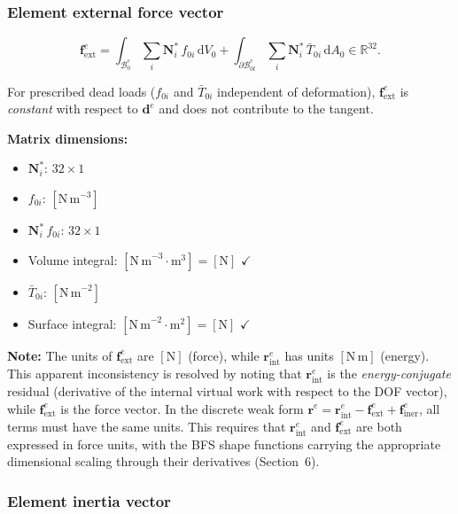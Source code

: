 \documentclass[11pt]{article}
\begin{document}
\subsubsection{Element external force vector}

\begin{equation}
\boxed{
\mathbf{f}_{\mathrm{ext}}^{e}
= \int_{\mathcal{B}_{0}^{e}}
  \sum_{i}\mathbf{N}_{i}^{*}\,f_{0i}\,
  \mathrm{d}V_{0}
+ \int_{\partial\mathcal{B}_{0t}^{e}}
  \sum_{i}\mathbf{N}_{i}^{*}\,\bar{T}_{0i}\,
  \mathrm{d}A_{0}
\in \mathbb{R}^{32}.
}
\label{s7:f_ext}
\end{equation}

For prescribed dead loads ($f_{0i}$ and $\bar{T}_{0i}$ independent of
deformation), $\mathbf{f}_{\mathrm{ext}}^{e}$ is \emph{constant} with
respect to $\mathbf{d}^{e}$ and does not contribute to the tangent.

\textbf{Matrix dimensions:}
\begin{itemize}
\item $\mathbf{N}_{i}^{*}$: $32\times 1$
\item $f_{0i}$: $[\mathrm{N\,m}^{-3}]$
\item $\mathbf{N}_{i}^{*}\,f_{0i}$: $32\times 1$
\item Volume integral: $[\mathrm{N\,m}^{-3}\cdot\mathrm{m}^{3}] = [\mathrm{N}]$ $\checkmark$
\item $\bar{T}_{0i}$: $[\mathrm{N\,m}^{-2}]$
\item Surface integral: $[\mathrm{N\,m}^{-2}\cdot\mathrm{m}^{2}] = [\mathrm{N}]$ $\checkmark$
\end{itemize}

\textbf{Note:} The units of $\mathbf{f}_{\mathrm{ext}}^{e}$ are $[\mathrm{N}]$ (force),
while $\mathbf{r}_{\mathrm{int}}^{e}$ has units $[\mathrm{N\,m}]$ (energy).
This apparent inconsistency is resolved by noting that $\mathbf{r}_{\mathrm{int}}^{e}$
is the \emph{energy-conjugate} residual (derivative of the internal
virtual work with respect to the DOF vector), while
$\mathbf{f}_{\mathrm{ext}}^{e}$ is the force vector. In the
discrete weak form $\mathbf{r}^{e}=\mathbf{r}_{\mathrm{int}}^{e}
- \mathbf{f}_{\mathrm{ext}}^{e} + \mathbf{f}_{\mathrm{iner}}^{e}$, all terms
must have the same units. This requires that $\mathbf{r}_{\mathrm{int}}^{e}$
and $\mathbf{f}_{\mathrm{ext}}^{e}$ are both expressed in force units,
with the BFS shape functions carrying the appropriate dimensional
scaling through their derivatives (Section~6).

\subsubsection{Element inertia vector}
\end{document}
